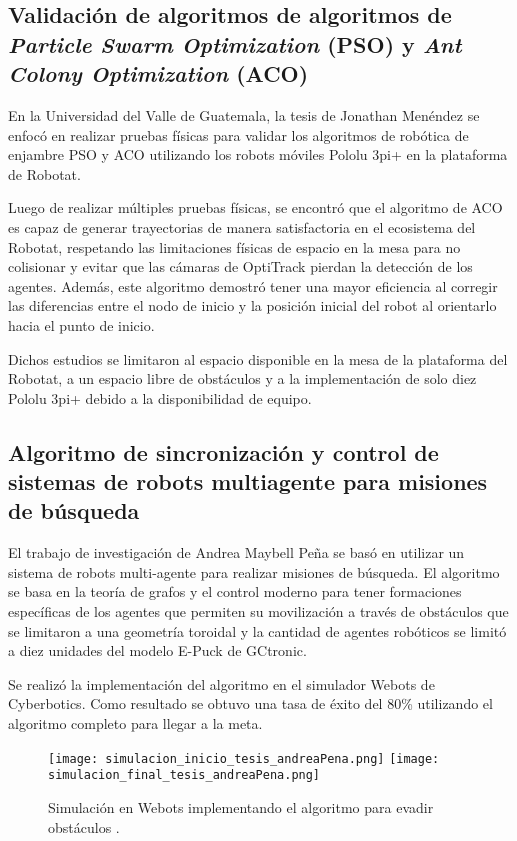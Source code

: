 \subsection*{Validación de algoritmos de algoritmos de \textit{Particle Swarm Optimization} (PSO) y \textit{Ant Colony Optimization} (ACO)}
En la Universidad del Valle de Guatemala, la tesis de Jonathan Menéndez \cite{MenendezJ_2023_tesis} se enfocó en realizar pruebas físicas para validar los algoritmos de robótica de enjambre PSO y ACO utilizando los robots móviles Pololu 3pi+ en la plataforma de Robotat. 

Luego de realizar múltiples pruebas físicas, se encontró que el algoritmo de ACO es capaz de generar trayectorias de manera satisfactoria en el ecosistema del Robotat, respetando las limitaciones físicas de espacio en la mesa para no colisionar y evitar que las cámaras de OptiTrack pierdan la detección de los agentes. Además, este algoritmo demostró tener una mayor eficiencia al corregir las diferencias entre el nodo de inicio y la posición inicial del robot al orientarlo hacia el punto de inicio. 

Dichos estudios se limitaron al espacio disponible en la mesa de la plataforma del Robotat, a un espacio libre de obstáculos y a la implementación de solo diez Pololu 3pi+ debido a la disponibilidad de equipo. 

\subsection*{Algoritmo de sincronización y control de sistemas de robots multiagente para misiones de búsqueda}
El trabajo de investigación de Andrea Maybell Peña \cite{PenaAM_2019_tesis} se basó en utilizar un sistema de robots multi-agente para realizar misiones de búsqueda. El algoritmo se basa en la teoría de grafos y el control moderno para tener formaciones específicas de los agentes que permiten su movilización a través de obstáculos que se limitaron a una geometría toroidal y la cantidad de agentes robóticos se limitó a diez unidades del modelo E-Puck de GCtronic.

Se realizó la implementación del algoritmo en el simulador Webots de Cyberbotics. Como resultado se obtuvo una tasa de éxito del 80\% utilizando el algoritmo completo para llegar a la meta.

\begin{figure}[H]
	\centering
	\texttt{[image: simulacion\_inicio\_tesis\_andreaPena.png]} \texttt{[image: simulacion\_final\_tesis\_andreaPena.png]}
	\caption{Simulación en Webots implementando el algoritmo para evadir obstáculos \cite{imgRobotat}.}
	\label{fig:tesis_andreaPena}
\end{figure}

